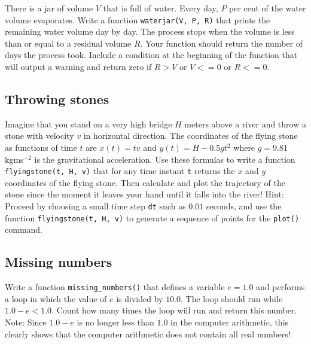 There is a jar of volume $V$ that is full of water. Every day, 
$P$ per cent of the water volume evaporates. Write a function 
{\tt waterjar(V, P, R)} that prints the remaining water volume day
by day. The process stops when the volume is less than or equal to 
a residual volume $R$. Your function should return the number of 
days the process took. Include a condition at the beginning 
of the function that will output a warning and return zero 
if $R > V$ or $V <= 0$ or $R <= 0$.


\subsection{Throwing stones}

Imagine that you stand on a very high bridge $H$ meters above 
a river and throw a stone with velocity $v$ in horizontal direction. 
The coordinates of the flying stone as functions of time $t$ are
$x(t) = t v$ and $y(t) = H - 0.5gt^2$ where $g = 9.81$ kgms$^{-2}$ is
the gravitational acceleration. Use these formulas to write a function 
{\tt flyingstone(t, H, v)} that for any time instant {\tt t} returns the $x$ and 
$y$ coordinates of the flying stone. Then calculate and plot the trajectory 
of the stone since the moment it leaves your hand until it falls into the 
river! Hint: Proceed by choosing a small time step {\tt dt} such 
as $0.01$ seconds, and use the function {\tt flyingstone(t, H, v)} to generate 
a sequence of points for the {\tt plot()} command.  


\subsection{Missing numbers}

Write a function {\tt missing\_numbers()} that defines a variable $e = 1.0$ 
and performs a loop in which the value of $e$ is divided by $10.0$. The loop should
run while $1.0 - e < 1.0$. Count how many times the loop will run and return 
this number. Note: Since $1.0 - e$ is no longer less than $1.0$ in the 
computer arithmetic, this clearly shows that the computer arithmetic
does not contain all real numbers!


